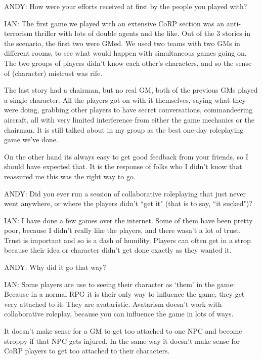 \documentclass[twoside]{book}
\begin{document}
\begin{description}
\item{ANDY:} How were your efforts received at first by the people you played with?

\item{IAN:} The first game we played with an extensive CoRP section was an anti-terrorism thriller with lots of double agents and the like. Out of the 3 stories in the scenario, the first two were GMed. We used two teams with two GMs in different rooms, to see what would happen with simultaneous games going on. The two groups of players didn't know each other's characters, and so the sense of (character) mistrust was rife.

The last story had a chairman, but no real GM, both of the previous GMs played a single character. All the players got on with it themselves, saying what they were doing, grabbing other players to have secret conversations, commandeering aircraft, all with very limited interference from either the game mechanics or the chairman. It is still talked about in my group as the best one-day roleplaying game we've done.

On the other hand its always easy to get good feedback from your friends, so I should have expected that. It is the response of folks who I didn't know that reassured me this was the right way to go.

\item{ANDY:} Did you ever run a session of collaborative roleplaying that just never went anywhere, or where the players didn't ``get it" (that is to say, ``it sucked")?

\item{IAN:} I have done a few games over the internet. Some of them have been pretty poor, because I didn't really like the players, and there wasn't a lot of trust. Trust is important and so is a dash of humility. Players can often get in a strop because their idea or character didn't get done exactly as they wanted it.

\item{ANDY:} Why did it go that way?

\item{IAN:} Some players are use to seeing their character as `them' in the game: Because in a normal RPG it is their only way to influence the game, they get very attached to it: They are avataristic. Avatarism doesn't work with collaborative roleplay, because you can influence the game in lots of ways.

It doesn't make sense for a GM to get too attached to one NPC and become stroppy if that NPC gets injured. In the same way it doesn't make sense for CoRP players to get too attached to their characters.


\end{description}
\end{document}

